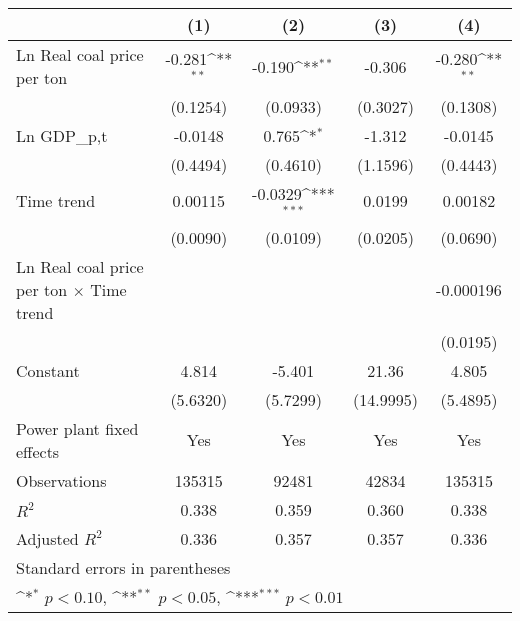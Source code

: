 {
\def\sym#1{\ifmmode^{#1}\else\(^{#1}\)\fi}
\begin{tabular}{l*{4}{c}}
\toprule
                    &\multicolumn{1}{c}{(1)}&\multicolumn{1}{c}{(2)}&\multicolumn{1}{c}{(3)}&\multicolumn{1}{c}{(4)}\\
\midrule
Ln Real coal price per ton&      -0.281\sym{**} &      -0.190\sym{**} &      -0.306         &      -0.280\sym{**} \\
                    &    (0.1254)         &    (0.0933)         &    (0.3027)         &    (0.1308)         \\
\addlinespace
Ln GDP\_{p,t}        &     -0.0148         &       0.765\sym{*}  &      -1.312         &     -0.0145         \\
                    &    (0.4494)         &    (0.4610)         &    (1.1596)         &    (0.4443)         \\
\addlinespace
Time trend          &     0.00115         &     -0.0329\sym{***}&      0.0199         &     0.00182         \\
                    &    (0.0090)         &    (0.0109)         &    (0.0205)         &    (0.0690)         \\
\addlinespace
Ln Real coal price per ton $\times$ Time trend&                     &                     &                     &   -0.000196         \\
                    &                     &                     &                     &    (0.0195)         \\
\addlinespace
Constant            &       4.814         &      -5.401         &       21.36         &       4.805         \\
                    &    (5.6320)         &    (5.7299)         &   (14.9995)         &    (5.4895)         \\
\addlinespace
Power plant fixed effects&         Yes         &         Yes         &         Yes         &         Yes         \\
\midrule
Observations        &      135315         &       92481         &       42834         &      135315         \\
\(R^{2}\)           &       0.338         &       0.359         &       0.360         &       0.338         \\
Adjusted \(R^{2}\)  &       0.336         &       0.357         &       0.357         &       0.336         \\
\bottomrule
\multicolumn{5}{l}{\footnotesize Standard errors in parentheses}\\
\multicolumn{5}{l}{\footnotesize \sym{*} \(p<0.10\), \sym{**} \(p<0.05\), \sym{***} \(p<0.01\)}\\
\end{tabular}
}
